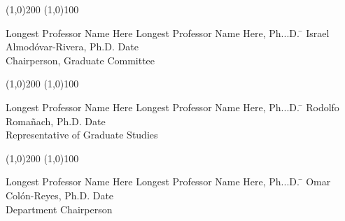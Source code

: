   \noindent
\line(1,0){200} \hspace{40 mm} \line(1,0){100}\\
  \noindent
\vspace{-1.75\baselineskip}
  \begin{tabbing}
Longest Professor Name Here Longest Professor Name Here, Ph...D.   \=  \kill 
Israel Almodóvar-Rivera, Ph.D. \>  Date\\Chairperson, Graduate Committee %
\end{tabbing}



  \noindent
\line(1,0){200} \hspace{40 mm} \line(1,0){100}\\
  \noindent
\vspace{-1.75\baselineskip}
  \begin{tabbing}
Longest Professor Name Here Longest Professor Name Here, Ph...D.  \=  \kill 
Rodolfo Romañach, Ph.D. \>  Date\\Representative of Graduate Studies  %
\end{tabbing}


  \noindent
  \line(1,0){200} \hspace{40 mm} \line(1,0){100}\\
  \noindent
\vspace{-1.75\baselineskip}
  \begin{tabbing}
Longest Professor Name Here Longest Professor Name Here, Ph...D.  \=  \kill 
Omar Colón-Reyes, Ph.D. \>  Date\\Department Chairperson  %
\end{tabbing}